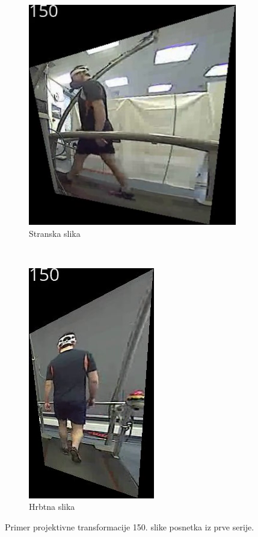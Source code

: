 \begin{figure}[!htb]
	\centering
	\begin{subfigure}[t]{0.45\columnwidth}
		\centering
		\includegraphics[width=0.6\columnwidth]{./Slike/projective-sv-150.png}
		\caption{Stranska slika}
	\end{subfigure}
	~
	\begin{subfigure}[t]{0.45\columnwidth}
		\centering
		\includegraphics[width=0.6\columnwidth]{./Slike/projective-bv-150.png}
		\caption{Hrbtna slika}
	\end{subfigure}
	\caption{Primer projektivne transformacije 150. slike posnetka iz prve serije.}
	\label{fig:projective}
\end{figure}


